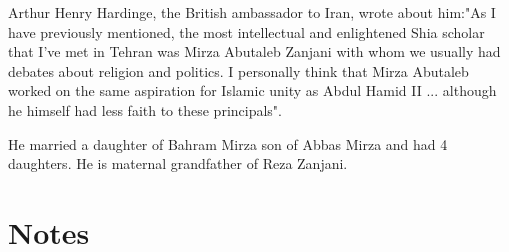 Arthur Henry Hardinge, the British ambassador to Iran, wrote about
him:"As I have previously mentioned, the most intellectual and
enlightened Shia scholar that I've met in Tehran was Mirza Abutaleb
Zanjani with whom we usually had debates about religion and politics. I
personally think that Mirza Abutaleb worked on the same aspiration for
Islamic unity as Abdul Hamid II ... although he himself had less faith
to these principals".

He married a daughter of Bahram Mirza son of Abbas Mirza and had 4
daughters. He is maternal grandfather of Reza Zanjani.

\section{Notes}\label{notes}
